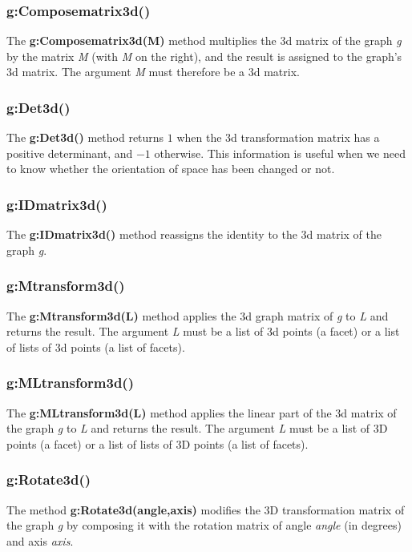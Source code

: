 \subsubsection{g:Composematrix3d()}
The \textbf{g:Composematrix3d(M)} method multiplies the 3d matrix of the graph \emph g by the matrix \emph{M} (with \emph{M} on the right), and the result is assigned to the graph's 3d matrix. The argument \emph{M} must therefore be a 3d matrix.

\subsubsection{g:Det3d()}
The \textbf{g:Det3d()} method returns $1$ when the 3d transformation matrix has a positive determinant, and $-1$ otherwise. This information is useful when we need to know whether the orientation of space has been changed or not.

\subsubsection{g:IDmatrix3d()}
The \textbf{g:IDmatrix3d()} method reassigns the identity to the 3d matrix of the graph \emph g.

\subsubsection{g:Mtransform3d()}
The \textbf{g:Mtransform3d(L)} method applies the 3d graph matrix of \emph g to \emph{L} and returns the result. The argument \emph L must be a list of 3d points (a facet) or a list of lists of 3d points (a list of facets).

\subsubsection{g:MLtransform3d()}
The \textbf{g:MLtransform3d(L)} method applies the linear part of the 3d matrix of the graph \emph g to \emph{L} and returns the result. The argument \emph L must be a list of 3D points (a facet) or a list of lists of 3D points (a list of facets).

\subsubsection{g:Rotate3d()}
The method \textbf{g:Rotate3d(angle,axis)} modifies the 3D transformation matrix of the graph \emph g by composing it with the rotation matrix of angle \emph{angle} (in degrees) and axis \emph{axis}.


